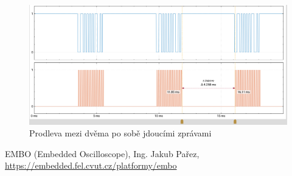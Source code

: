 \documentclass[twoside]{article}
\begin{document}
\begin{figure}[htbp]
    \includegraphics[width=\linewidth]{vic_zprav.png}
    \caption{Prodleva mezi dvěma po sobě jdoucími zprávami}
    \label{fig:prodleva}
\end{figure}

\begin{thebibliography}{9}
    
    EMBO (Embedded Oscilloscope), Ing. Jakub Pařez, \url{https://embedded.fel.cvut.cz/platformy/embo}
\end{thebibliography}
\end{document}
